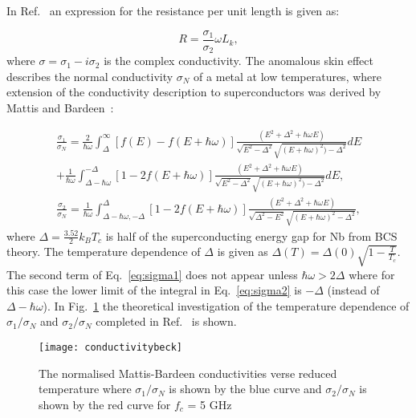 In Ref.~\citep{402973} an expression for the resistance per unit length is given as:

\begin{equation}
\label{eq:reistanceperunitlength}
R = \frac{\sigma_{1}}{\sigma_{2}} \omega L_{k},
\end{equation} 
where $\sigma= \sigma_{1}-i\sigma_{2}$ is the complex conductivity. The anomalous skin effect~\citep{10.1038/165239b0} describes the normal conductivity $\sigma_{N}$ of a metal at low temperatures, where extension of the conductivity description to superconductors was derived by Mattis and Bardeen~\citep{PhysRev.111.412}:  

  \begin{equation}
  \begin{aligned}
\label{eq:sigma1}
\frac{\sigma_{1}}{\sigma_{N}}=\frac{2}{\hbar \omega} \int_{\Delta}^{\infty} \left [ f(E)-f(E+\hbar \omega) \right ] \frac{(E^{2}+\Delta^{2}+\hbar \omega E)}{\sqrt{E^{2}-\Delta^{2}}\sqrt{(E+\hbar \omega)^{2})-\Delta^{2}}} dE \\
+\frac{1}{\hbar \omega} \int_{\Delta-\hbar \omega}^{-\Delta} \left [  1-2f(E+\hbar \omega)\right ] \frac{(E^{2}+\Delta^{2}+\hbar \omega E)}{\sqrt{E^{2}-\Delta^{2}}\sqrt{(E+\hbar \omega)^{2})-\Delta^{2}}} dE,
\end{aligned}
\end{equation} 
  \begin{equation}
\begin{aligned}
\label{eq:sigma2}
\frac{\sigma_{2}}{\sigma_{N}}= \frac{1}{\hbar \omega} \int_{\Delta-\hbar \omega, -\Delta}^{\Delta} \left [  1-2f(E+\hbar \omega) \right ] \frac{(E^{2}+\Delta^{2}+\hbar \omega E)}{\sqrt{\Delta^{2}-E^{2}} \sqrt{(E+\hbar \omega)^2-\Delta^{2}}},
\end{aligned}
\end{equation}   
\noindent where $\Delta = \frac{3.52}{2}k_{B}T_{c}$ is half of the superconducting energy gap for Nb from BCS theory. The temperature dependence of $\Delta$ is given as $\Delta (T) = \Delta(0) \sqrt{1-\frac{T}{T_{c}}}$. The second term of Eq.~\ref{eq:sigma1} does not appear unless $\hbar \omega > 2 \Delta$ where for this case the lower limit of the integral in Eq.~\ref{eq:sigma2} is $- \Delta$ (instead of $\Delta - \hbar \omega$). 
In Fig.~\ref{fig:conductivitybeck} the theoretical investigation of the temperature dependence of $\sigma_{1}/\sigma_{N}$ and $\sigma_{2} / \sigma_{N}$ completed in Ref.~\citep{mattbeck} is shown. 

\begin{figure}[H]
\centering
\texttt{[image: conductivitybeck]}
\caption{\label{fig:conductivitybeck} The normalised Mattis-Bardeen conductivities verse reduced temperature where $\sigma_{1} / \sigma_{N}$ is shown by the blue curve and $\sigma_{2} / \sigma_{N}$ is shown by the red curve for $f_{c}$ = 5 GHz \citep{1347-4065-33-10R-5708}}
\end{figure}


